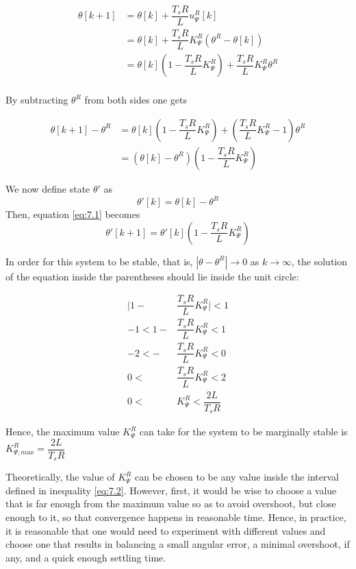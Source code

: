 \begin{align*}
  \theta[k+1] &= \theta[k] + \dfrac{T_s R}{L} u_{\Psi}^R[k]  \\
            ~ &= \theta[k] + \dfrac{T_s R}{L} K_{\Psi}^R (\theta^R - \theta[k]) \\
            ~ &= \theta[k](1 - \dfrac{T_s R}{L} K_{\Psi}^R) + \dfrac{T_s R}{L} K_{\Psi}^R \theta^R  \\
\end{align*}

By subtracting $\theta^R$ from both sides one gets

\begin{align}
  \theta[k+1] - \theta^R &= \theta[k](1 - \dfrac{T_s R}{L} K_{\Psi}^R) + (\dfrac{T_s R}{L} K_{\Psi}^R - 1) \theta^R \nonumber \\
                     ~ &= (\theta[k] - \theta^R)(1 - \dfrac{T_s R}{L} K_{\Psi}^R) \label{eq:7.1}
\end{align}

We now define state $\theta'$ as
$$\theta'[k] = \theta[k] - \theta^R$$
Then, equation \ref{eq:7.1} becomes
$$\theta'[k+1] = \theta'[k](1 - \dfrac{T_s R}{L} K_{\Psi}^R)$$

In order for this system to be stable, that is, $| \theta - \theta^R | \rightarrow 0$
as $k \rightarrow \infty$, the solution of the equation inside the parentheses
should lie inside the unit circle:

\begin{align}
  \Big|1 - &\dfrac{T_s R}{L} K_{\Psi}^R\Big| < 1 \nonumber \\
  -1 < 1 - &\dfrac{T_s R}{L} K_{\Psi}^R < 1 \nonumber \\
  -2 < - &\dfrac{T_s R}{L} K_{\Psi}^R < 0 \nonumber \\
   0 <\ &\dfrac{T_s R}{L} K_{\Psi}^R < 2 \nonumber \\
   0 <\ &K_{\Psi}^R < \dfrac{2L}{T_s R} \label{eq:7.2}
\end{align}

Hence, the maximum value $K_{\Psi}^R$ can take for the system to be marginally
stable is $K_{\Psi,max}^R = \dfrac{2L}{T_s R}$

Theoretically, the value of $K_{\Psi}^R$ can be chosen to be any value inside
the interval defined in inequality \ref{eq:7.2}. However, first, it would be
wise to choose a value that is far enough from the maximum value so as to avoid
overshoot, but close enough to it, so that convergence happens in reasonable
time. Hence, in practice, it is reasonable that one would need to experiment
with different values and choose one that results in balancing a small angular
error, a minimal overshoot, if any, and a quick enough settling time.
